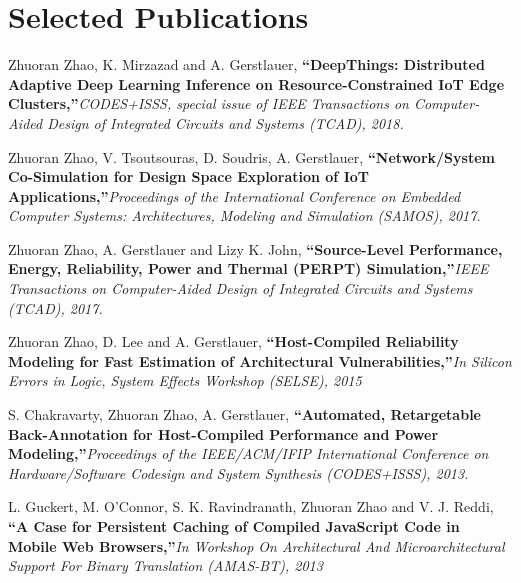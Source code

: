 \documentclass[letterpaper,11pt]{article}
\begin{document}
\newcommand{\reference}[2]{\justifying\textbf{``#1,''}{\it #2}\par}


\section{Selected Publications}
\begin{enumerate}[label={[\arabic*]}, leftmargin=*]

  \item \label{DeepThings} {{Zhuoran Zhao}, K. Mirzazad and A. Gerstlauer, \reference{DeepThings: Distributed Adaptive Deep Learning Inference on Resource-Constrained IoT Edge Clusters} 
    {CODES+ISSS, special issue of IEEE Transactions on Computer-Aided Design of Integrated Circuits and Systems (TCAD), 2018.} \vspace{-3pt}}
  \item \label{NoSSim} {{Zhuoran Zhao}, V. Tsoutsouras, D. Soudris, A. Gerstlauer, \reference{Network/System Co-Simulation for Design Space Exploration of IoT Applications} 
    {Proceedings of the International Conference on Embedded Computer Systems: Architectures, Modeling and Simulation (SAMOS), 2017.} \vspace{-3pt}}
  \item \label{PERPT} {{Zhuoran Zhao}, A. Gerstlauer and Lizy K. John, \reference{Source-Level Performance, Energy, Reliability, Power and Thermal (PERPT) Simulation} 
    {IEEE Transactions on Computer-Aided Design of Integrated Circuits and Systems (TCAD), 2017.} \vspace{-3pt}}
  \item \label{Web} {Zhuoran Zhao, D. Lee and A. Gerstlauer, \reference{Host-Compiled Reliability Modeling for Fast Estimation of Architectural Vulnerabilities} 
    {In Silicon Errors in Logic, System Effects Workshop (SELSE), 2015} \vspace{-3pt}}
  \item \label{RBA} {S. Chakravarty, { Zhuoran Zhao}, A. Gerstlauer, \reference{Automated, Retargetable Back-Annotation for Host-Compiled Performance and Power Modeling} 
    {Proceedings of the IEEE/ACM/IFIP International Conference on Hardware/Software Codesign and System Synthesis (CODES+ISSS), 2013.} \vspace{-3pt}}
  \item \label{Web} {L. Guckert, M. O'Connor, S. K. Ravindranath, { Zhuoran Zhao} and V. J. Reddi, \reference{A Case for Persistent Caching of Compiled JavaScript Code in Mobile Web Browsers} 
    {In Workshop On Architectural And Microarchitectural Support For Binary Translation (AMAS-BT), 2013} \vspace{-3pt}}



\end{enumerate}
\end{document}
